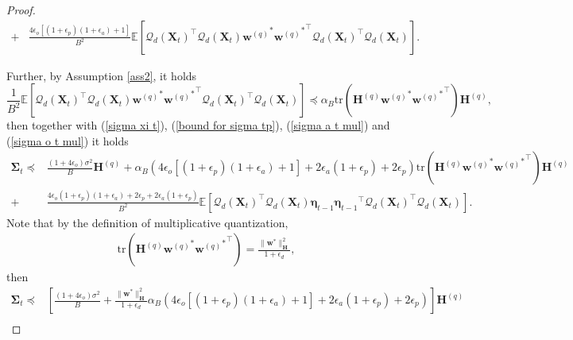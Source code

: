 \documentclass[11pt, letterpaper]{article}
\begin{document}
\begin{proof}
\begin{equation}
\begin{aligned}
            +&\frac{4\epsilon_o[(1+\epsilon_p)(1+\epsilon_a)+1]}{B^2}\mathbb{E}\left[{\mathcal{Q}_d(\mathbf{X}_t)}^\top {\mathcal{Q}_d(\mathbf{X}_t)} {\mathbf{w}^{(q)}}^*{{\mathbf{w}^{(q)}}^*}^\top{\mathcal{Q}_d(\mathbf{X}_t)}^\top \mathcal{Q}_d(\mathbf{X}_t)\right].
        \end{aligned}
    \end{equation}

    Further, by Assumption \ref{ass2}, it holds
    \begin{equation*}
        \frac{1}{B^2}\mathbb{E}\left[{\mathcal{Q}_d(\mathbf{X}_t)}^\top {\mathcal{Q}_d(\mathbf{X}_t)} {\mathbf{w}^{(q)}}^*{{\mathbf{w}^{(q)}}^*}^\top{\mathcal{Q}_d(\mathbf{X}_t)}^\top \mathcal{Q}_d(\mathbf{X}_t)\right]\preceq \alpha_B\mathrm{tr}\left(\mathbf{H}^{(q)}{\mathbf{w}^{(q)}}^*{{\mathbf{w}^{(q)}}^*}^\top\right)\mathbf{H}^{(q)},
    \end{equation*}
    then together with (\ref{sigma xi t}), (\ref{bound for sigma tp}), (\ref{sigma a t mul}) and (\ref{sigma o t mul}) it holds
    \begin{equation*}
        \begin{aligned}
            \boldsymbol{\Sigma}_t \preceq& \frac{(1+4\epsilon_o)\sigma^2}{B}\mathbf{H}^{(q)} + \alpha_B\left(4\epsilon_o[(1+\epsilon_p)(1+\epsilon_a)+1]+2\epsilon_a(1+\epsilon_p)+2\epsilon_p \right)\mathrm{tr}\left(\mathbf{H}^{(q)}{\mathbf{w}^{(q)}}^*{{\mathbf{w}^{(q)}}^*}^\top \right)\mathbf{H}^{(q)}\\
            +&\frac{4\epsilon_o(1+\epsilon_p)(1+\epsilon_a)+2\epsilon_p+2\epsilon_a(1+\epsilon_p)}{B^2}\mathbb{E}\left[{\mathcal{Q}_d(\mathbf{X}_t)}^\top {\mathcal{Q}_d(\mathbf{X}_t)}\boldsymbol{\eta}_{t-1}{\boldsymbol{\eta}_{t-1}}^\top{\mathcal{Q}_d(\mathbf{X}_t)}^\top\mathcal{Q}_d(\mathbf{X}_t)\right].
        \end{aligned}
    \end{equation*}
    Note that by the definition of multiplicative quantization,
    \begin{equation*}
        \begin{aligned}
            \mathrm{tr}\left(\mathbf{H}^{(q)}{\mathbf{w}^{(q)}}^*{{\mathbf{w}^{(q)}}^*}^\top \right)=\frac{\|\mathbf{w}^*\|_\mathbf{H}^2}{1+\epsilon_d},
        \end{aligned}
    \end{equation*}
    then
    \begin{equation}
    \label{sigma t mul}
        \begin{aligned}
            \boldsymbol{\Sigma}_t \preceq& \left[\frac{(1+4\epsilon_o)\sigma^2}{B} + \frac{\|\mathbf{w}^*\|_\mathbf{H}^2}{1+\epsilon_d}\alpha_B\left(4\epsilon_o[(1+\epsilon_p)(1+\epsilon_a)+1]+2\epsilon_a(1+\epsilon_p)+2\epsilon_p \right)\right]\mathbf{H}^{(q)}\\

\end{aligned}
\end{equation}
\end{proof}
\end{document}
